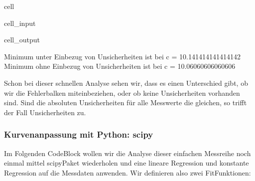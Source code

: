 \documentclass[letterpaper,10pt,english]{jupyterBook}
\begin{document}
\begin{sphinxuseclass}{cell}
\begin{sphinxVerbatimInput}
\begin{sphinxuseclass}{cell_input}
\end{sphinxuseclass}\end{sphinxVerbatimInput}
\begin{sphinxVerbatimOutput}

\begin{sphinxuseclass}{cell_output}
\begin{sphinxVerbatim}[commandchars=\\\{\}]
Minimum unter Einbezug von Unsicherheiten ist bei c = 10.141414141414142
Minimum ohne  Einbezug von Unsicherheiten ist bei c = 10.06060606060606
\end{sphinxVerbatim}

\noindent{}

\end{sphinxuseclass}\end{sphinxVerbatimOutput}

\end{sphinxuseclass}
\sphinxAtStartPar
Schon bei dieser schnellen Analyse sehen wir, dass es einen Unterschied gibt, ob wir die Fehlerbalken miteinbeziehen, oder ob keine Unsicherheiten vorhanden sind. Sind die absoluten Unsicherheiten für alle Messwerte die gleichen, so trifft der Fall  Unsicherheiten zu.


\subsubsection{Kurvenanpassung mit Python: scipy }
\label{\detokenize{content/1_Kurvenanpassung:kurvenanpassung-mit-python-scipy-a-id-subsec-scipy-bsp2-a}}
\sphinxAtStartPar
Im Folgenden Code\sphinxhyphen{}Block wollen wir die Analyse dieser einfachen Messreihe noch einmal mittel scipy\sphinxhyphen{}Paket wiederholen und eine lineare Regression und konstante Regression auf die Messdaten anwenden. Wir definieren also zwei Fit\sphinxhyphen{}Funktionen:
\end{document}
